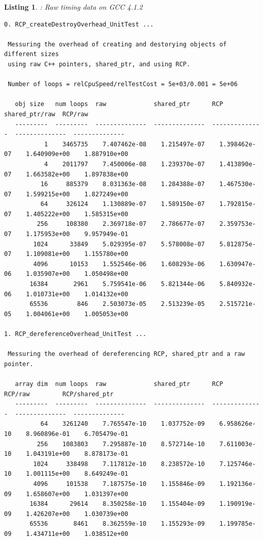 \documentclass[pdf,ps2pdf,11pt]{SANDreport}
\newtheorem{listing}{Listing}
\begin{document}
\begin{listing}: Raw {} timing data on GCC 4.1.2  \\
\label{listing:RCP-GCC-Timings}
{\scriptsize\begin{verbatim}
0. RCP_createDestroyOverhead_UnitTest ... 
 
 Messuring the overhead of creating and destorying objects of different sizes
 using raw C++ pointers, shared_ptr, and using RCP.
 
 Number of loops = relCpuSpeed/relTestCost = 5e+03/0.001 = 5e+06
 
   obj size   num loops  raw             shared_ptr      RCP             shared_ptr/raw  RCP/raw       
   ---------  ---------  --------------  --------------  --------------  --------------  --------------
           1    3465735    7.407462e-08    1.215497e-07    1.398462e-07    1.640909e+00    1.887910e+00
           4    2011797    7.450006e-08    1.239370e-07    1.413890e-07    1.663582e+00    1.897838e+00
          16     885379    8.031363e-08    1.284388e-07    1.467530e-07    1.599215e+00    1.827249e+00
          64     326124    1.130889e-07    1.589150e-07    1.792815e-07    1.405222e+00    1.585315e+00
         256     108380    2.369718e-07    2.786677e-07    2.359753e-07    1.175953e+00    9.957949e-01
        1024      33849    5.029395e-07    5.578008e-07    5.812875e-07    1.109081e+00    1.155780e+00
        4096      10153    1.552546e-06    1.608293e-06    1.630947e-06    1.035907e+00    1.050498e+00
       16384       2961    5.759541e-06    5.821344e-06    5.840932e-06    1.010731e+00    1.014132e+00
       65536        846    2.503073e-05    2.513239e-05    2.515721e-05    1.004061e+00    1.005053e+00

1. RCP_dereferenceOverhead_UnitTest ... 
 
 Messuring the overhead of dereferencing RCP, shared_ptr and a raw pointer.
 
   array dim  num loops  raw             shared_ptr      RCP             RCP/raw         RCP/shared_ptr
   ---------  ---------  --------------  --------------  --------------  --------------  --------------
          64    3261240    7.765547e-10    1.037752e-09    6.958626e-10    8.960896e-01    6.705479e-01
         256    1083803    7.295887e-10    8.572714e-10    7.611003e-10    1.043191e+00    8.878173e-01
        1024     338498    7.117812e-10    8.238572e-10    7.125746e-10    1.001115e+00    8.649249e-01
        4096     101538    7.187575e-10    1.155846e-09    1.192136e-09    1.658607e+00    1.031397e+00
       16384      29614    8.350258e-10    1.155404e-09    1.190919e-09    1.426207e+00    1.030739e+00
       65536       8461    8.362559e-10    1.155293e-09    1.199785e-09    1.434711e+00    1.038512e+00


\end{verbatim}}
\end{listing}
\end{document}
